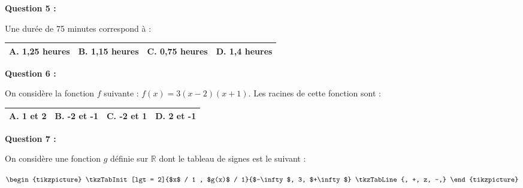 \documentclass[12pt,a4paper]{exam}
\begin{document}
\vspace{10pt}

\textbf{Question 5 :}
\vspace{5pt}

Une durée de 75 minutes correspond à :

\begin{center}
    \renewcommand{\arraystretch}{3}
    \begin{tabular}{|m{3.4cm}|m{3.4cm}|m{3.9cm}|m{3.4cm}|}
    \hline
    \centering \vspace{-0.3cm} \textbf{A.} 1,25 heures & 
    \centering \vspace{-0.3cm} \textbf{B.} 1,15 heures & 
    \centering \vspace{-0.3cm} \textbf{C.} 0,75 heures & 
    \centering \vspace{-0.3cm} \textbf{D.} 1,4 heures \tabularnewline
    \hline
    \end{tabular}
\end{center}

\vspace{10pt}

\textbf{Question 6 :}
\vspace{5pt}

On considère la fonction $f$ suivante : $f(x) = 3(x-2)(x+1)$. Les racines de cette fonction sont :

\begin{center}
    \renewcommand{\arraystretch}{3}
    \begin{tabular}{|m{3.4cm}|m{3.4cm}|m{3.9cm}|m{3.4cm}|}
    \hline
    \centering \vspace{-0.3cm} \textbf{A.} 1 et 2 & 
    \centering \vspace{-0.3cm} \textbf{B.} -2 et -1 & 
    \centering \vspace{-0.3cm} \textbf{C.} -2 et 1 & 
    \centering \vspace{-0.3cm} \textbf{D.} 2 et -1 \tabularnewline
    \hline
    \end{tabular}
\end{center}

\vspace{10pt}

\textbf{Question 7 :}
\vspace{5pt}

On considère une fonction $g$ définie sur $\mathbb{R}$ dont le tableau de signes est le suivant : 

\begin{center}
    $
    \begin{tikzpicture}
    \tkzTabInit[lgt = 2]{$x$ / 1 , $g(x)$ / 1}{$-\infty$, 3, $+\infty$}
    \tkzTabLine{, +, z, -,}
    \end{tikzpicture}
    $
\end{center}
\end{document}
